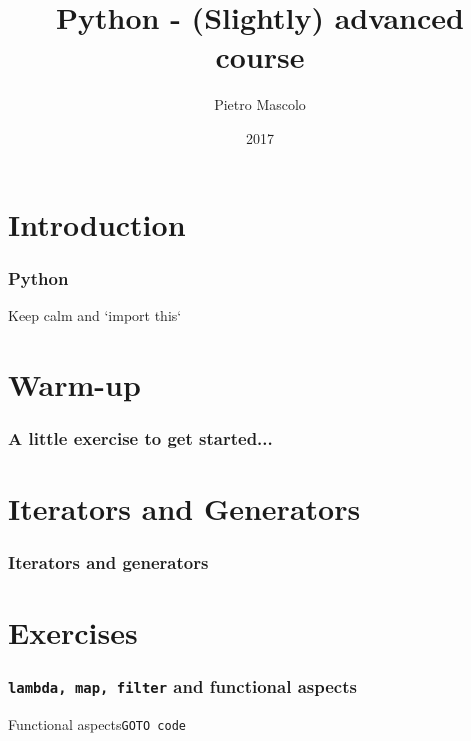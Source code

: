 \documentclass[11pt]{beamer}
\title[Python Course]{\textbf{Python - (Slightly) advanced course}}
\institute[Optum]{Optum Technology}
\author[]{Pietro Mascolo}
\date{2017}
\begin{document}
\maketitle

\section{Introduction}
\begin{frame}
\frametitle{Python}
Keep calm and `import this`
\end{frame}


\section{Warm-up}
\begin{frame}
\frametitle{A little exercise to get started...}

\end{frame}

\section{Iterators and Generators}
\begin{frame}
	\frametitle{Iterators and generators}
\end{frame}

\section{Exercises}
\begin{frame}
\frametitle{\texttt{lambda, map, filter} and functional aspects}
\begin{block}
{Functional aspects}{\texttt{GOTO code}}
\end{block}
\end{frame}
\end{document}
